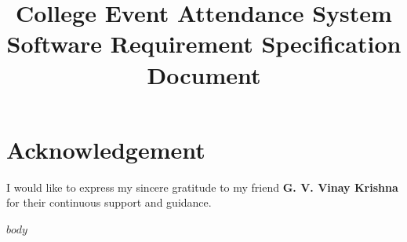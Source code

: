 \documentclass[12pt,a4paper]{article}
\title{
    \textbf{College Event Attendance System}\\
    \large Software Requirement Specification Document
}
\begin{document}
\maketitle
\thispagestyle{empty}
\newpage

\section*{Acknowledgement}
I would like to express my sincere gratitude to my friend \textbf{ G. V. Vinay Krishna } for their continuous support and guidance.

\newpage

\tableofcontents
\newpage


$body$
\end{document}
